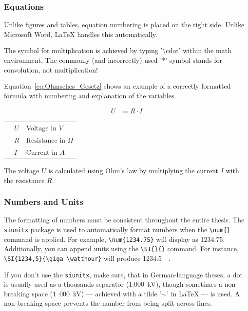 \documentclass[a4paper, fleqn, headsepline, footsepline, 12pt, parskip=half]{scrartcl}
\begin{document}
\subsubsection{Equations}
\label{sec:equations}

Unlike figures and tables, equation numbering is placed on the right side. Unlike Microsoft Word, LaTeX handles this automatically.

The symbol for multiplication is achieved by typing '\textbackslash cdot' within the math environment. The commonly (and incorrectly) used '*' symbol stands for convolution, not multiplication!

Equation~\ref{eq:Ohmsches_Gesetz} shows an example of a correctly formatted formula with numbering and explanation of the variables.

\begin{align}
	\label{eq:Ohmsches_Gesetz}
	U &= R \cdot I
\end{align}
\vspace*{-1cm}
\begin{table}[H]
	\begin{tabular}{@{}p{1cm}@{}p{1cm}<{\dotfill}@{}p{\dimexpr\linewidth-5cm}}
		& $U$ & Voltage in $V$  \\
		& $R$ & Resistance in $\Omega$ \\
		& $I$ & Current in $A$ 
	\end{tabular}
\end{table}

The voltage $U$ is calculated using Ohm’s law by multiplying the current $I$ with the resistance $R$.


\subsubsection{Numbers and Units}
\label{sec:numbersAndUnits}

The formatting of numbers must be consistent throughout the entire thesis. The \texttt{siunitx} package is used to automatically format numbers when the \verb|\num{}| command is applied. For example, \verb|\num{1234.75}| will display as \num{1234.75}. Additionally, you can append units using the \verb|\SI{}{}| command. For instance, \verb|\SI{1234,5}{\giga \watthour}| will produce \SI{1234,5}{\giga\watthour}.

If you don't use the \texttt{siunitx}, make sure, that in German-language theses, a dot is usually used as a thousands separator (1.000~kV), though sometimes a non-breaking space (1~000~kV) — achieved with a tilde '$\sim$' in LaTeX — is used. A non-breaking space prevents the number from being split across lines.
\end{document}
